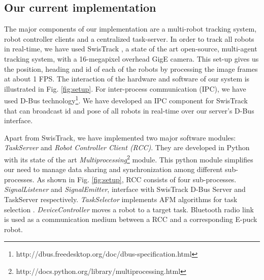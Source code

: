 \documentclass{llncs}
\begin{document}
\subsection{Our current implementation}
The major components of our implementation are a multi-robot tracking system, robot controller clients and a centralized task-server. In order to track all robots in real-time, we have used SwisTrack \cite{SwisTrack}, a state of the art open-source, multi-agent tracking system, with a 16-megapixel overhead GigE camera. This set-up gives us the position, heading and id of each of the robots by processing the image frames at about 1 FPS. The interaction of the hardware and software of our system is illustrated in Fig. \ref{fig:setup}.
For inter-process communication (IPC), we have used D-Bus technology\footnote{http://dbus.freedesktop.org/doc/dbus-specification.html}. We have developed an IPC component for SwisTrack  that can broadcast id and pose of all robots in real-time over our server's D-Bus interface.

Apart from SwisTrack, we have implemented two major software modules: {\em TaskServer} and {\em Robot Controller Client (RCC)}. They are developed in Python with its state of the art \textit{Multiprocessing}\footnote{http://docs.python.org/library/multiprocessing.html} module. This python module simplifies our need to manage data sharing and synchronization among different sub-processes. As shown in Fig. \ref{fig:setup}, RCC consists of four sub-processes. {\em SignalListener} and {\em SignalEmitter}, interface with SwisTrack D-Bus Server and TaskServer respectively. {\em TaskSelector} implements AFM algorithms for task selection . {\em DeviceController} moves a robot to a target task. Bluetooth radio link is used as a communication medium between a RCC and a corresponding E-puck robot. 
\end{document}

